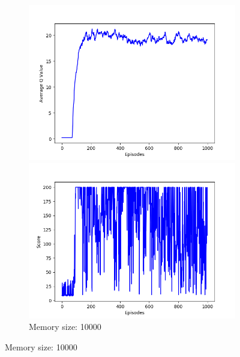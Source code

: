 \documentclass{article}
\begin{document}
\begin{figure}[!htbp]
  \begin{subfigure}{\textwidth}
    \begin{minipage}{0.5\textwidth}
      \centering
      \includegraphics[scale=0.45]{../experiments/mem_size_10000/qvalues.png}
    \end{minipage}
    \begin{minipage}{0.5\textwidth}
      \centering
      \includegraphics[scale=0.45]{../experiments/mem_size_10000/scores.png}
    \end{minipage}
    \caption{Memory size: 10000}
  \end{subfigure}%


\end{figure}
\end{document}

